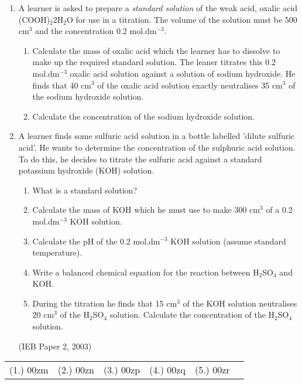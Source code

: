 {\begin{enumerate}
\item{A learner is asked to prepare a \textit{standard solution} of the weak acid, oxalic acid (COOH)$_{2}$2H$_{2}$O for use in a titration. The volume of the solution must be 500 cm$^{3}$ and the concentration 0.2 mol.dm$^{-3}$.
\begin{enumerate}
\item{Calculate the mass of oxalic acid which the learner has to dissolve to make up the required standard solution.}
The leaner titrates this 0.2 mol.dm$^{-3}$ oxalic acid solution against a solution of sodium hydroxide. He finds that 40 cm$^{3}$ of the oxalic acid solution exactly neutralises 35 cm$^{3}$ of the sodium hydroxide solution.
\item{Calculate the concentration of the sodium hydroxide solution.}
\end{enumerate}
}

\item{A learner finds some sulfuric acid solution in a bottle labelled 'dilute sulfuric acid'. He wants to determine the concentration of the sulphuric acid solution. To do this, he decides to titrate the sulfuric acid against a standard potassium hydroxide (KOH) solution.

\begin{enumerate}
\item{What is a standard solution?}
\item{Calculate the mass of KOH which he must use to make 300 cm$^{3}$ of a 0.2 mol.dm$^{-3}$ KOH solution.}
\item{Calculate the pH of the 0.2 mol.dm$^{-3}$ KOH solution (assume standard temperature).}
\item{Write a balanced chemical equation for the reaction between H$_{2}$SO$_{4}$ and KOH.}
\item{During the titration he finds that 15 cm$^{3}$ of the KOH solution neutralises 20 cm$^{3}$ of the H$_{2}$SO$_{4}$ solution. Calculate the concentration of the H$_{2}$SO$_{4}$ solution.}
\end{enumerate}
(IEB Paper 2, 2003)
}

\end{enumerate}
\practiceinfo

\begin{tabular}[h]{cccccc}
(1.) 00zm & (2.) 00zn & (3.) 00zp & (4.) 00zq & (5.) 00zr & 
 \end{tabular}
}







